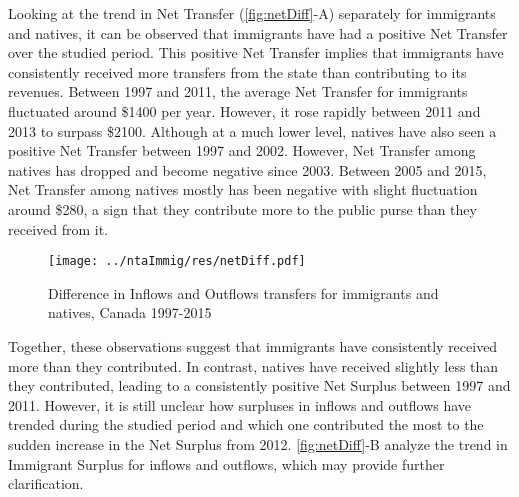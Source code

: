 \vspace{0.7em}\par
Looking at the trend in Net Transfer (\autoref{fig:netDiff}-A) separately for immigrants and natives, it can be observed that immigrants have had a positive Net Transfer over the studied period.
This positive Net Transfer implies that immigrants have consistently received more transfers from the state than contributing to its revenues.
Between 1997 and 2011, the average Net Transfer for immigrants fluctuated around \$\num{1400} per year.
However, it rose rapidly between 2011 and 2013 to surpass \$\num{2100}.
Although at a much lower level, natives have also seen a positive Net Transfer between 1997 and 2002.
However, Net Transfer among natives has dropped and become negative since 2003.
Between 2005 and 2015, Net Transfer among natives mostly has been negative with slight fluctuation around \$280, a sign that they contribute more to the public purse than they received from it.

\begin{figure}[H]%
  \caption{Difference in Inflows and Outflows transfers for immigrants and natives, Canada 1997-2015}
  \texttt{[image: ../ntaImmig/res/netDiff.pdf]}%
  \label{fig:netDiff}%
\end{figure}%

\vspace{0.7em}\par
Together, these observations suggest that immigrants have consistently received more than they contributed.
In contrast, natives have received slightly less than they contributed, leading to a consistently positive Net Surplus between 1997 and 2011.
However, it is still unclear how surpluses in inflows and outflows have trended during the studied period and which one contributed the most to the sudden increase in the Net Surplus from 2012.
\autoref{fig:netDiff}-B analyze the trend in Immigrant Surplus for inflows and outflows, which may provide further clarification.

